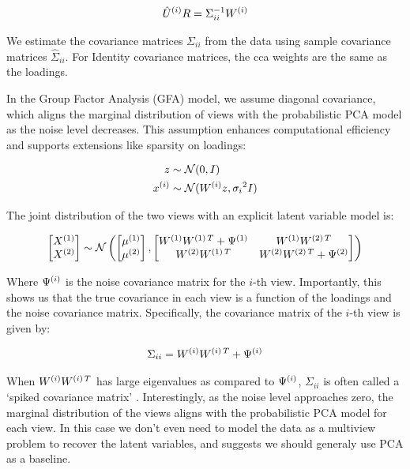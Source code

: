 \begin{align}\label{eq:loadings-to-weights}
    \hat{U}^{(i)}R = \Sigma_{ii}^{-1} W^{(i)}
\end{align}

We estimate the covariance matrices \(\Sigma_{ii}\) from the data using sample covariance matrices \(\hat{\Sigma}_{ii}\).
For Identity covariance matrices, the \acrshort{cca} weights are the same as the loadings.

In the Group Factor Analysis (GFA) model, we assume diagonal covariance, which aligns the marginal distribution of views with the probabilistic PCA model as the noise level decreases.
This assumption enhances computational efficiency and supports extensions like sparsity on loadings:

\begin{align}
    z &\sim \mathcal{N}(0, I)\\
    x^{(i)} &\sim \mathcal{N}(W^{(i)} z, {\sigma_{i}}^{2}I)
\end{align}

The joint distribution of the two views with an explicit latent variable model is:

\begin{align}
    \begin{bmatrix}
        X^{(1)} \\ X^{(2)}
    \end{bmatrix} \sim \mathcal{N} \left( \begin{bmatrix}
                                              \mu^{(1)} \\ \mu^{(2)}
    \end{bmatrix}, \begin{bmatrix}
                       W^{(1)}W^{(1)\,T} + \Psi^{(1)} & W^{(1)}W^{(2)\,T} \\ W^{(2)}W^{(1)\,T} & W^{(2)}W^{(2)\,T} + \Psi^{(2)}
    \end{bmatrix} \right)
\end{align}

Where \(\Psi^{(i)}\) is the noise covariance matrix for the \(i\)-th view.
Importantly, this shows us that the true covariance in each view is a function of the loadings and the noise covariance matrix.
Specifically, the covariance matrix of the \(i\)-th view is given by:

\begin{align}
    \Sigma_{ii} = W^{(i)}W^{(i)\,T} + \Psi^{(i)}
\end{align}

When $W^{(i)}W^{(i)\,T}$ has large eigenvalues as compared to $\Psi^{(i)}$, $\Sigma_{ii}$ is often called a `spiked covariance matrix' \citep{johnstone2001distribution}.
Interestingly, as the noise level approaches zero, the marginal distribution of the views aligns with the probabilistic PCA model for each view.
In this case we don't even need to model the data as a multiview problem to recover the latent variables, and suggests we should generaly use PCA as a baseline.

